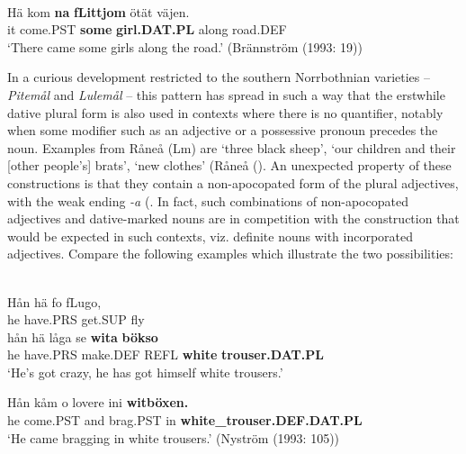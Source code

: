 
\ea \label{} 
\\
\gll Hä  kom  \textbf{na} \textbf{  fLi{\textasciigrave}ttjom} ötät  väjen.\\
it  come.PST  \textbf{some} \textbf{girl.DAT.PL} along  road.DEF\\
\glt ‘There came some girls along the road.’ (Brännström (1993: 19)) 

\z

In a curious development restricted to the southern Norrbothnian varieties –  \textit{Pitemål} and \textit{Lulemål} – this pattern has spread in such a way that the erstwhile dative plural form is also used in contexts where there is no quantifier, notably when some modifier such as an adjective or a possessive pronoun precedes the noun. Examples from Råneå (Lm) are  ‘three black sheep’,  ‘our children and their [other people’s] brats’,  ‘new clothes’ (Råneå (\citet{Wikberg2004}). An unexpected property of these constructions is that they contain a non-apocopated form of the plural adjectives, with the weak ending\textit{ {}-a }(\citet[36]{Dahlstedt1956}. In fact, such combinations of non-apocopated adjectives and dative-marked nouns are in competition with the construction that would be expected in such contexts, viz. definite nouns with incorporated adjectives. Compare the following examples which illustrate the two possibilities:


\ea\label{}
\\
\gll Hån  hä  fo  fLugo,\\
he  have.PRS  get.SUP  fly\\
\gll hån  hä  låga  se  \textbf{wita} \textbf{bökso}\\
he  have.PRS  make.DEF  REFL  \textbf{white} \textbf{trouser.DAT.PL}\\
\glt ‘He’s got crazy, he has got himself white trousers.’

\z

\ea
\gll Hån  kåm  o  lovere  ini  \textbf{witböxen.}\\
he  come.PST  and  brag.PST  in  \textbf{white\_trouser.DEF.DAT.PL}\\
\glt ‘He came bragging in white trousers.’ (Nyström (1993: 105))

